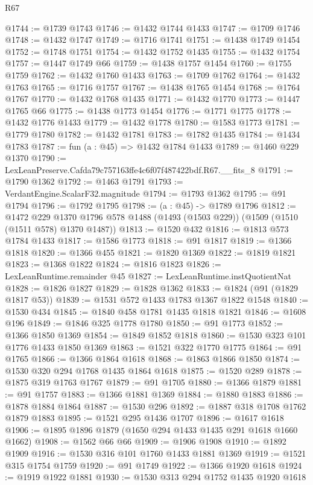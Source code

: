 \begin{lexlean}{R67}
\begin{coremodule}
@1744 := @1739 @1743
@1746 := @1432 @1744 @1433
@1747 := @1709 @1746
@1748 := @1432 @1747
@1749 := @1716 @1741
@1751 := @1438 @1749 @1454
@1752 := @1748 @1751
@1754 := @1432 @1752 @1435
@1755 := @1432 @1754
@1757 := @1447 @1749 @66
@1759 := @1438 @1757 @1454
@1760 := @1755 @1759
@1762 := @1432 @1760 @1433
@1763 := @1709 @1762
@1764 := @1432 @1763
@1765 := @1716 @1757
@1767 := @1438 @1765 @1454
@1768 := @1764 @1767
@1770 := @1432 @1768 @1435
@1771 := @1432 @1770
@1773 := @1447 @1765 @66
@1775 := @1438 @1773 @1454
@1776 := @1771 @1775
@1778 := @1432 @1776 @1433
@1779 := @1432 @1778
@1780 := @1583 @1773
@1781 := @1779 @1780
@1782 := @1432 @1781
@1783 := @1782 @1435
@1784 := @1434 @1783
@1787 := fun (a : @45) => @1432 @1784 @1433
@1789 := @1460 @229 @1370
@1790 := LexLeanPreserve.Cafda79c757163ffe4c6f07f487422bdf.R67.__fits_8
@1791 := @1790 @1362
@1792 := @1463 @1791
@1793 := VerdantEngine.ScalarF32.magnitude
@1794 := @1793 @1362
@1795 := @91 @1794
@1796 := @1792 @1795
@1798 := (a : @45) -> @1789 @1796
@1812 := @1472
    @229
    @1370
    @1796
    @578
    @1488
    (@1493 (@1503 @229))
    (@1509 (@1510 (@1511 @578) @1370 @1487))
@1813 := @1520 @432
@1816 := @1813 @573 @1784 @1433
@1817 := @1586 @1773
@1818 := @91 @1817
@1819 := @1366 @1818
@1820 := @1366 @455
@1821 := @1820 @1369
@1822 := @1819 @1821
@1823 := @1368 @1822
@1824 := @1816 @1823
@1826 := LexLeanRuntime.remainder @45
@1827 := LexLeanRuntime.instQuotientNat
@1828 := @1826 @1827
@1829 := @1828 @1362
@1833 := @1824 (@91 (@1829 @1817 @53))
@1839 := @1531 @572 @1433 @1783 @1367 @1822 @1548
@1840 := @1530 @434
@1845 := @1840 @458 @1781 @1435 @1818 @1821
@1846 := @1608 @196
@1849 := @1846 @325 @1778 @1780
@1850 := @91 @1773
@1852 := @1366 @1850 @1369
@1854 := @1849 @1852 @1818
@1860 := @1530 @323 @101 @1776 @1433 @1850 @1369
@1863 := @1521 @322 @1770 @1775
@1864 := @91 @1765
@1866 := @1366 @1864 @1618
@1868 := @1863 @1866 @1850
@1874 := @1530 @320 @294 @1768 @1435 @1864 @1618
@1875 := @1520 @289
@1878 := @1875 @319 @1763 @1767
@1879 := @91 @1705
@1880 := @1366 @1879
@1881 := @91 @1757
@1883 := @1366 @1881 @1369
@1884 := @1880 @1883
@1886 := @1878 @1884 @1864
@1887 := @1530 @296
@1892 := @1887 @318 @1708 @1762 @1879 @1883
@1895 := @1521 @295 @1436 @1707
@1896 := @1617 @1618
@1906 := @1895 @1896 @1879 (@1650 @294 @1433 @1435 @291 @1618 @1660 @1662)
@1908 := @1562 @66 @66
@1909 := @1906 @1908
@1910 := @1892 @1909
@1916 := @1530 @316 @101 @1760 @1433 @1881 @1369
@1919 := @1521 @315 @1754 @1759
@1920 := @91 @1749
@1922 := @1366 @1920 @1618
@1924 := @1919 @1922 @1881
@1930 := @1530 @313 @294 @1752 @1435 @1920 @1618

\end{coremodule}
\end{lexlean}
